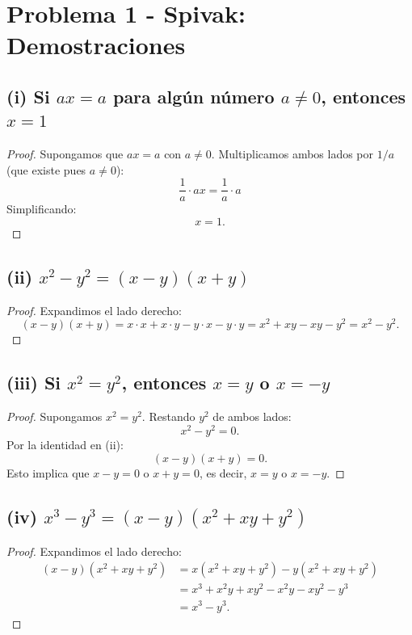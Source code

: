 
\section*{Problema 1 - Spivak: Demostraciones}

\subsection*{(i) Si $ax = a$ para algún número $a \neq 0$, entonces $x = 1$}

\begin{proof}
Supongamos que $ax = a$ con $a \neq 0$. Multiplicamos ambos lados por $1/a$ (que existe pues $a \neq 0$):
\[
\frac{1}{a} \cdot ax = \frac{1}{a} \cdot a
\]
Simplificando:
\[
x = 1.
\]
\end{proof}

\subsection*{(ii) $x^2 - y^2 = (x - y)(x + y)$}

\begin{proof}
Expandimos el lado derecho:
\[
(x - y)(x + y) = x \cdot x + x \cdot y - y \cdot x - y \cdot y = x^2 + xy - xy - y^2 = x^2 - y^2.
\]
\end{proof}

\subsection*{(iii) Si $x^2 = y^2$, entonces $x = y$ o $x = -y$}

\begin{proof}
Supongamos $x^2 = y^2$. Restando $y^2$ de ambos lados:
\[
x^2 - y^2 = 0.
\]
Por la identidad en (ii):
\[
(x - y)(x + y) = 0.
\]
Esto implica que $x - y = 0$ o $x + y = 0$, es decir, $x = y$ o $x = -y$.
\end{proof}

\subsection*{(iv) $x^3 - y^3 = (x - y)(x^2 + xy + y^2)$}

\begin{proof}
Expandimos el lado derecho:
\begin{align*}
(x - y)(x^2 + xy + y^2) &= x(x^2 + xy + y^2) - y(x^2 + xy + y^2)\\
&= x^3 + x^2y + xy^2 - x^2y - xy^2 - y^3\\
&= x^3 - y^3.
\end{align*}
\end{proof}

